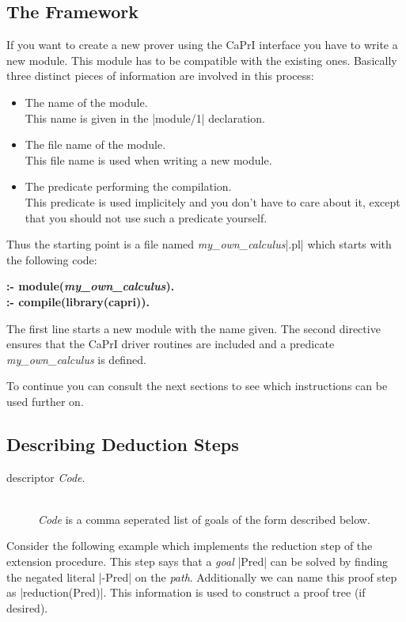\subsection{The Framework}

If you want to create a new prover using the CaPrI interface you have to write
a new module. This module has to be compatible with the existing ones.
Basically three distinct pieces of information are involved in this process:
\begin{itemize}
  \item The name of the module.\\
	This name is given in the |module/1| declaration.
  \item The file name of the module.\\
	This file name is used when writing a new module.
  \item The predicate performing the compilation.\\
	This predicate is used implicitely and you don't have to care about
	it, except that you should not use such a predicate yourself.
\end{itemize}

Thus the starting point is a file named {\em my\_own\_calculus}|.pl| which
starts with the following code:
\smallskip

{\bf :- module({\em my\_own\_calculus}).\\
     :- compile(library(capri)).
}
\medskip

The first line starts a new module with the name given. The second directive
ensures that the CaPrI driver routines are included and a predicate {\em
my\_own\_calculus} is defined.

To continue you can consult the next sections to see which instructions can be
used further on.


\subsection{Describing Deduction Steps}

\begin{description}
  \item [descriptor {\em Code}.]\ \\
	{\em Code}\/ is a comma seperated list of goals of the form described
	below.
\end{description}

Consider the following example which implements the reduction step of the
extension procedure. This step says that a {\em goal}\/ |Pred| can be solved
by finding the negated literal |-Pred| on the {\em path}. Additionally we can
name this proof step as |reduction(Pred)|. This information is used to
construct a proof tree (if desired).

